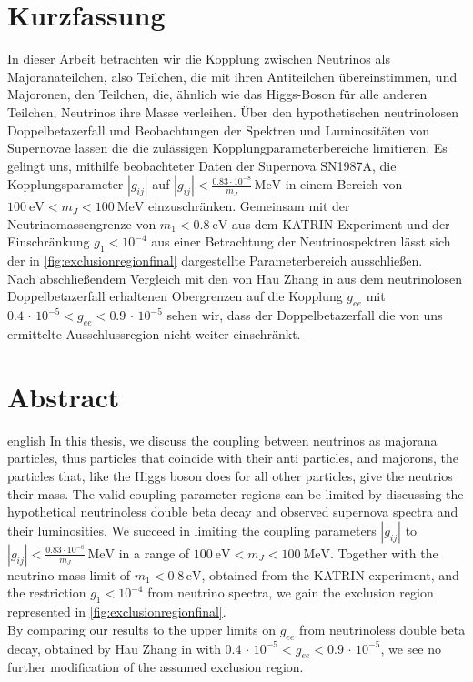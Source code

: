 \thispagestyle{plain}

\section*{Kurzfassung}
In dieser Arbeit betrachten wir die Kopplung zwischen Neutrinos als Majoranateilchen, also Teilchen, die mit ihren Antiteilchen übereinstimmen, und Majoronen, den Teilchen, die,
ähnlich wie das Higgs-Boson für alle anderen Teilchen, Neutrinos ihre Masse verleihen.
Über den hypothetischen neutrinolosen Doppelbetazerfall und Beobachtungen der Spektren und Luminositäten von Supernovae lassen die die zulässigen Kopplungparameterbereiche limitieren.
Es gelingt uns, mithilfe beobachteter Daten der Supernova SN1987A, die Kopplungsparameter $|g_{i j}|$ auf $|g_{i j}| < \frac{\num{0.83} \cdot 10^{-8}}{m_J} \,\si{\mega\eV}$ 
in einem Bereich von $\SI{100}{\eV} < m_J < \SI{100}{\mega\eV}$ einzuschränken.
Gemeinsam mit der Neutrinomassengrenze von $m_1 < \SI{0.8}{\eV}$ aus dem KATRIN-Experiment und der Einschränkung $g_1 < 10^{-4}$ aus einer Betrachtung der Neutrinospektren lässt sich der in \autoref{fig:exclusionregionfinal}
dargestellte Parameterbereich ausschließen. \\
Nach abschließendem Vergleich mit den von Hau Zhang in \cite{hauhau} aus dem neutrinolosen Doppelbetazerfall erhaltenen Obergrenzen auf die Kopplung $g_{ee}$ mit $\num{0.4} \, \cdot \, 10^{-5} < g_{ee} < \num{0.9} \, \cdot \, 10^{-5}$ sehen wir, dass
der Doppelbetazerfall die von uns ermittelte Ausschlussregion nicht weiter einschränkt.

\section*{Abstract}
\begin{foreignlanguage}{english}
In this thesis, we discuss the coupling between neutrinos as majorana particles, thus particles that coincide with their anti particles, and majorons, the particles that, like the Higgs boson does for all other
particles, give the neutrios their mass.
The valid coupling parameter regions can be limited by discussing the hypothetical neutrinoless double beta decay and observed supernova spectra and their luminosities.
We succeed in limiting the coupling parameters $|g_{i j}|$ to $|g_{i j}| < \frac{0.83 \cdot 10^{-8}}{m_J} \,\si{\mega\eV}$ in a range of $\SI{100}{\eV} < m_J < \SI{100}{\mega\eV}$.
Together with the neutrino mass limit of $m_1 < 0.8 \,\si{\eV}$, obtained from the KATRIN experiment, and the restriction $g_1 < 10^{-4}$ from neutrino spectra, we gain the exclusion region represented in
\autoref{fig:exclusionregionfinal}. \\
By comparing our results to the upper limits on $g_{ee}$ from neutrinoless double beta decay, obtained by Hau Zhang in \cite{hauhau} with $\num{0.4} \, \cdot \, 10^{-5} < g_{ee} < \num{0.9} \, \cdot \, 10^{-5}$, we see no further
modification of the assumed exclusion region.
\end{foreignlanguage}
